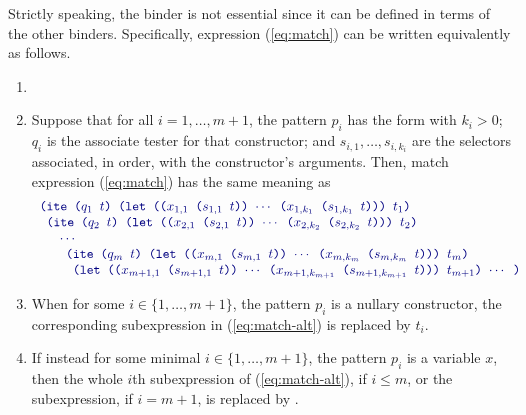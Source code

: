 Strictly speaking, the  binder is not essential 
since it can be defined in terms of the other binders. 
Specifically, expression (\ref{eq:match})
can be written equivalently as follows.
\begin{enumerate}
\item 
{}
\item
Suppose that for all $i=1,\ldots, m + 1$, the pattern $p_i$ has the form
 with $k_i>0$;
$q_i$ is the associate tester for that constructor; and
$s_{i,1}, \ldots, s_{i,k_i}$ are the selectors associated, in order,
with the constructor's arguments.
Then, match expression (\ref{eq:match}) has the same meaning as 
%
\begin{equation} \label{eq:match-alt}
\begin{array}{l}
\expr{(ite ($q_1$ $t$) 
 (let (($x_{1,1}$ ($s_{1,1}$ $t$)) $\cdots$ ($x_{1,k_1}$ ($s_{1,k_1}$ $t$))) $t_1$)}
\\
\expr{ (ite ($q_2$ $t$) 
 (let (($x_{2,1}$ ($s_{2,1}$ $t$)) $\cdots$ ($x_{2,k_2}$ ($s_{2,k_2}$ $t$))) $t_2$)}
\\
\quad \expr{ $\cdots$}
\\
\quad\quad\expr{(ite ($q_m$ $t$) 
 (let (($x_{m,1}$ ($s_{m,1}$ $t$)) $\cdots$ ($x_{m,k_m}$ ($s_{m,k_m}$ $t$))) $t_m$)}
\\
\quad\quad\expr{ (let (($x_{m+1,1}$ ($s_{m+1,1}$ $t$)) $\cdots$ ($x_{m+1,k_{m+1}}$ ($s_{m+1,k_{m+1}}$ $t$))) $t_{m+1}$) $\cdots$ ) }
\end{array}
\end{equation}

\item 
When for some $i \in \{1,\ldots, m + 1\}$, the pattern $p_i$ is a nullary constructor, 
the corresponding  subexpression in (\ref{eq:match-alt}) is replaced 
by $t_i$.

\item 
If instead for some minimal $i \in \{1,\ldots, m + 1\}$, the pattern $p_i$ is
a variable $x$, then the whole $i$th  subexpression of (\ref{eq:match-alt}),
if $i\leq m$, 
or the  subexpression, if $i=m + 1$, is replaced by .
\end{enumerate}



